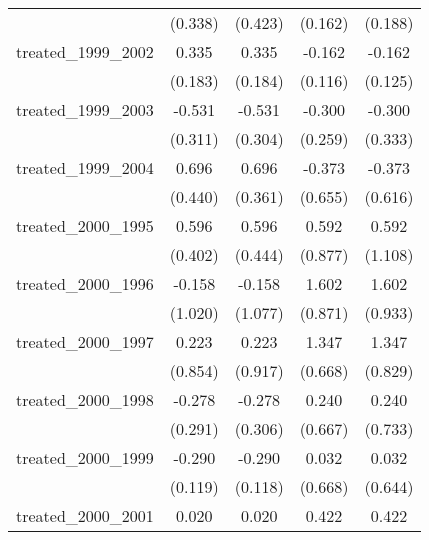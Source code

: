 {\begin{tabular}{l*{4}{c}}
            &     (0.338)         &     (0.423)         &     (0.162)         &     (0.188)         \\
[1em]
treated\_1999\_2002&       0.335         &       0.335         &      -0.162         &      -0.162         \\
            &     (0.183)         &     (0.184)         &     (0.116)         &     (0.125)         \\
[1em]
treated\_1999\_2003&      -0.531         &      -0.531         &      -0.300         &      -0.300         \\
            &     (0.311)         &     (0.304)         &     (0.259)         &     (0.333)         \\
[1em]
treated\_1999\_2004&       0.696         &       0.696         &      -0.373         &      -0.373         \\
            &     (0.440)         &     (0.361)         &     (0.655)         &     (0.616)         \\
[1em]
treated\_2000\_1995&       0.596         &       0.596         &       0.592         &       0.592         \\
            &     (0.402)         &     (0.444)         &     (0.877)         &     (1.108)         \\
[1em]
treated\_2000\_1996&      -0.158         &      -0.158         &       1.602         &       1.602         \\
            &     (1.020)         &     (1.077)         &     (0.871)         &     (0.933)         \\
[1em]
treated\_2000\_1997&       0.223         &       0.223         &       1.347\sym{*}  &       1.347         \\
            &     (0.854)         &     (0.917)         &     (0.668)         &     (0.829)         \\
[1em]
treated\_2000\_1998&      -0.278         &      -0.278         &       0.240         &       0.240         \\
            &     (0.291)         &     (0.306)         &     (0.667)         &     (0.733)         \\
[1em]
treated\_2000\_1999&      -0.290\sym{*}  &      -0.290\sym{*}  &       0.032         &       0.032         \\
            &     (0.119)         &     (0.118)         &     (0.668)         &     (0.644)         \\
[1em]
treated\_2000\_2001&       0.020         &       0.020         &       0.422         &       0.422         \\

\end{tabular}}
